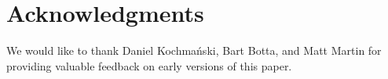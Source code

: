 \section{Acknowledgments} 

We would like to thank Daniel Kochmański, Bart Botta, and Matt Martin
for providing valuable feedback on early versions of this paper.
